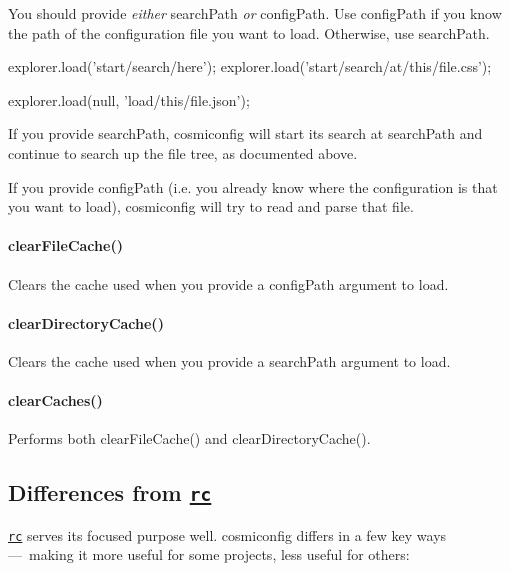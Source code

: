 You should provide {\itshape either} {\ttfamily search\+Path} {\itshape or} {\ttfamily config\+Path}. Use {\ttfamily config\+Path} if you know the path of the configuration file you want to load. Otherwise, use {\ttfamily search\+Path}.


\begin{DoxyCode}
explorer.load('start/search/here');
explorer.load('start/search/at/this/file.css');

explorer.load(null, 'load/this/file.json');
\end{DoxyCode}


If you provide {\ttfamily search\+Path}, cosmiconfig will start its search at {\ttfamily search\+Path} and continue to search up the file tree, as documented above.

If you provide {\ttfamily config\+Path} (i.\+e. you already know where the configuration is that you want to load), cosmiconfig will try to read and parse that file.

\paragraph*{{\ttfamily clear\+File\+Cache()}}

Clears the cache used when you provide a {\ttfamily config\+Path} argument to {\ttfamily load}.

\paragraph*{{\ttfamily clear\+Directory\+Cache()}}

Clears the cache used when you provide a {\ttfamily search\+Path} argument to {\ttfamily load}.

\paragraph*{{\ttfamily clear\+Caches()}}

Performs both {\ttfamily clear\+File\+Cache()} and {\ttfamily clear\+Directory\+Cache()}.

\subsection*{Differences from \href{https://github.com/dominictarr/rc}{\tt rc}}

\href{https://github.com/dominictarr/rc}{\tt rc} serves its focused purpose well. cosmiconfig differs in a few key ways — making it more useful for some projects, less useful for others\+:


